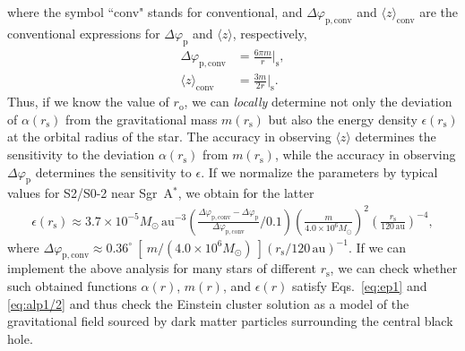\documentclass[aps,11pt,nofootinbib,preprintnumbers,groupedaddress,superscriptaddress]{revtex4-2}
\begin{document}
where 
the symbol ``conv" stands for conventional, 
and $\Delta \varphi_{\mathrm{p}, \mathrm{conv}}$ and 
$\langle z\rangle_{\mathrm{conv}}$ are the conventional expressions for 
$\Delta \varphi_{\mathrm{p}}$ and $\langle z\rangle$, respectively, 
\begin{align}
\Delta \varphi_{\mathrm{p}, \mathrm{conv}}
&=\frac{6\pi m}{r}\Big|_{\mathrm{s}},
\\
\langle z\rangle_{\mathrm{conv}}
&=\frac{3m}{2r}\Big|_{\mathrm{s}}.
\end{align}
Thus, if we know the value of $r_{\mathrm{o}}$, we can \textit{locally} determine not only 
the deviation of $\alpha(r_{\mathrm{s}})$ from the gravitational mass $m(r_{\mathrm{s}})$ but also the energy density $\epsilon(r_{\mathrm{s}})$
at the orbital radius of the star.
The accuracy in observing 
$\langle z\rangle$
determines the sensitivity to the deviation $\alpha(r_{\mathrm{s}})$ from $m(r_{\mathrm{s}})$, while the accuracy in observing $\Delta \varphi_{\mathrm{p}}$ determines the sensitivity to $\epsilon$. If we normalize the parameters by 
typical values for S2/S0-2 near Sgr~A$^\ast$,
we obtain for the latter 
\begin{align}
\epsilon(r_{\mathrm{s}}) \approx 3.7 \times 10^{-5} M_{\odot} \mathrm{\, au}^{-3}
\left(
\frac{
\Delta \varphi_{\mathrm{p}, \mathrm{conv}}
-\Delta \varphi_{\mathrm{p}}}{
\Delta \varphi_{\mathrm{p}, \mathrm{conv}}
}\bigg/0.1
\right)\left(\frac{m}{4.0\times 10^6 M_{\odot}}\right)^2 \left(
\frac{r_{\mathrm{s}}}{120 \mathrm{\, au}}
\right)^{-4},
\end{align}
where 
$\Delta \varphi_{\mathrm{p, conv}}
\approx 0.36^{\circ}\:\! [\:\!m/(4.0\times10^6 M_\odot)\:\!](r_{\mathrm{s}}/120\mathrm{\, au})^{-1}$.
If we can implement the above 
analysis
for many stars of different $r_{\mathrm{s}}$, we can check whether such obtained functions $\alpha(r)$, $m(r)$, and $\epsilon(r)$ satisfy Eqs.~\eqref{eq:ep1} and \eqref{eq:alp1/2} and thus check the Einstein cluster solution 
as a model of the gravitational field sourced by dark matter particles surrounding the central black hole. 




\end{document}
